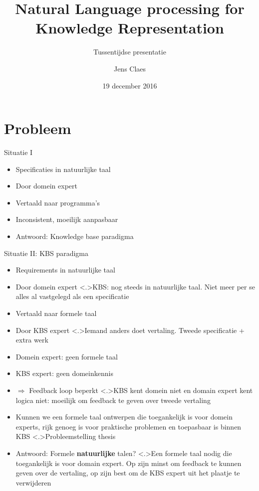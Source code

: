 \documentclass[notes, dvipsnames]{beamer}
\title{Natural Language processing for Knowledge Representation}
\subtitle{Tussentijdse presentatie}
\author{Jens Claes}
\date{19 december 2016}
\newcommand{\seperation}{
	\vspace{1em}
	\ppause
}
\newcommand{\hitem}{
	\ppause
	\item
}
\newcommand{\ppause}{\onslide<+>}
\newcommand{\nnote}[1]{\note<.>{#1}}
\begin{document}
	\frame{\titlepage}
	\section{Probleem}
	\begin{frame}{Situatie I}
		\begin{itemize}
			\hitem Specificaties in natuurlijke taal
			\item Door domein expert
			
			\seperation
			
			\item Vertaald naar programma's
			\item Inconsistent, moeilijk aanpasbaar
			
			\seperation
			
			\item Antwoord: Knowledge base paradigma
		\end{itemize}
		
	\end{frame}
	\begin{frame}{Situatie II: KBS paradigma}
			\begin{itemize}
				\hitem Requirements in natuurlijke taal
				\item Door domein expert
				\nnote{KBS: nog steeds in natuurlijke taal. Niet meer per se alles al vastgelegd als een specificatie}
				
				\seperation
				
				\item Vertaald naar formele taal
				\item Door KBS expert
				\nnote{Iemand anders doet vertaling. Tweede specificatie + extra werk}
				
				\seperation
				
				\item Domein expert: geen formele taal
				\item KBS expert: geen domeinkennis
				\item $\Rightarrow$ Feedback loop beperkt
				\nnote{KBS kent domein niet en domain expert kent logica niet: moeilijk om feedback te geven over tweede vertaling}
				
				\seperation
				
				\item Kunnen we een formele taal ontwerpen die toegankelijk is voor domein experts, rijk genoeg is voor praktische problemen en toepasbaar is binnen KBS
				\nnote{Probleemstelling thesis}
				
				\seperation
				
				\item Antwoord: Formele \textbf{natuurlijke} talen?
				\nnote{Een formele taal nodig die toegankelijk is voor domain expert. Op zijn minst om feedback te kunnen geven over de vertaling, op zijn best om de KBS expert uit het plaatje te verwijderen}
			\end{itemize}
	\end{frame}
	
\end{document}
